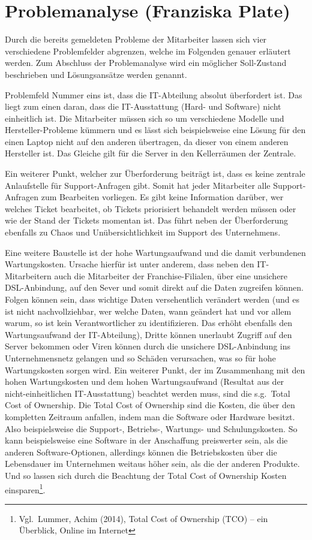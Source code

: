 \section{Problemanalyse (Franziska Plate)}

Durch die bereits gemeldeten Probleme der Mitarbeiter lassen sich vier
verschiedene Problemfelder abgrenzen, welche im Folgenden genauer
erläutert werden. Zum Abschluss der Problemanalyse wird ein möglicher
Soll-Zustand beschrieben und Lösungsansätze werden genannt.

Problemfeld Nummer eins ist, dass die IT-Abteilung absolut überfordert
ist. Das liegt zum einen daran, dass die IT-Ausstattung (Hard- und
Software) nicht einheitlich ist. Die Mitarbeiter müssen sich so um
verschiedene Modelle und Hersteller-Probleme kümmern und es lässt sich
beispielsweise eine Lösung für den einen Laptop nicht auf den anderen
übertragen, da dieser von einem anderen Hersteller ist. Das Gleiche
gilt für die Server in den Kellerräumen der Zentrale.

Ein weiterer Punkt, welcher zur Überforderung beiträgt ist, dass es
keine zentrale Anlaufstelle für Support-Anfragen gibt. Somit hat jeder
Mitarbeiter alle Support-Anfragen zum Bearbeiten vorliegen. Es gibt
keine Information darüber, wer welches Ticket bearbeitet, ob Tickets
priorisiert behandelt werden müssen oder wie der Stand der Tickets
momentan ist. Das führt neben der Überforderung ebenfalls zu Chaos und
Unübersichtlichkeit im Support des Unternehmens.

Eine weitere Baustelle ist der hohe Wartungsaufwand und die damit
verbundenen Wartungskosten. Ursache hierfür ist unter anderem, dass
neben den IT-Mitarbeitern auch die Mitarbeiter der Franchise-Filialen,
über eine unsichere DSL-Anbindung, auf den Sever und somit direkt auf
die Daten zugreifen können. Folgen können sein, dass wichtige Daten
versehentlich verändert werden (und es ist nicht nachvollziehbar, wer
welche Daten, wann geändert hat und vor allem warum, so ist kein
Verantwortlicher zu identifizieren. Das erhöht ebenfalls den
Wartungsaufwand der IT-Abteilung), Dritte können unerlaubt Zugriff auf
den Server bekommen oder Viren können durch die unsichere
DSL-Anbindung ins Unternehmensnetz gelangen und so Schäden
verursachen, was so für hohe Wartungskosten sorgen wird. Ein weiterer
Punkt, der im Zusammenhang mit den hohen Wartungskosten und dem hohen
Wartungsaufwand (Resultat aus der nicht-einheitlichen IT-Ausstattung)
beachtet werden muss, sind die s.g.~Total Cost of Ownership. Die Total
Cost of Ownership sind die Kosten, die über den kompletten Zeitraum
anfallen, indem man die Software oder Hardware besitzt. Also
beispielsweise die Support-, Betriebs-, Wartungs- und
Schulungskosten. So kann beispielsweise eine Software in der
Anschaffung preiswerter sein, als die anderen Software-Optionen,
allerdings können die Betriebskosten über die Lebensdauer im
Unternehmen weitaus höher sein, als die der anderen Produkte. Und so
lassen sich durch die Beachtung der Total Cost of Ownership Kosten
einsparen\footnote{Vgl.~Lummer, Achim (2014), Total Cost of Ownership
  (TCO) – ein Überblick, Online im Internet}.

